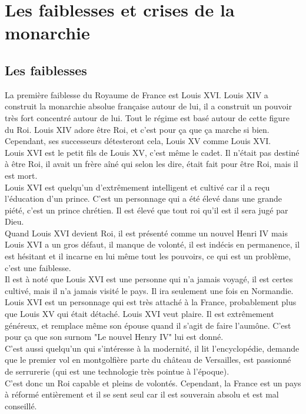 \documentclass[10pt, a4paper, openany]{book}
\begin{document}
\section{Les faiblesses et crises de la monarchie}

\subsection{Les faiblesses}

La première faiblesse du Royaume de France est Louis XVI. Louis XIV a construit la monarchie absolue française autour de lui, il a construit un pouvoir très fort concentré autour de lui. Tout le régime est basé autour de cette figure du Roi. Louis XIV adore être Roi, et c'est pour ça que ça marche si bien. Cependant, ses successeurs détesteront cela, Louis XV comme Louis XVI. \\
Louis XVI est le petit fils de Louis XV, c'est même le cadet. Il n'était pas destiné à être Roi, il avait un frère aîné qui selon les dire, était fait pour être Roi, mais il est mort. \\
Louis XVI est quelqu'un d'extrêmement intelligent et cultivé car il a reçu l'éducation d'un prince. C'est un personnage qui a été élevé dans une grande piété, c'est un prince chrétien. Il est élevé que tout roi qu'il est il sera jugé par Dieu. \\
Quand Louis XVI devient Roi, il est présenté comme un nouvel Henri IV mais Louis XVI a un gros défaut, il manque de volonté, il est indécis en permanence, il est hésitant et il incarne en lui même tout les pouvoirs, ce qui est un problème, c'est une faiblesse. \\
Il est à noté que Louis XVI est une personne qui n'a jamais voyagé, il est certes cultivé, mais il n'a jamais visité le pays. Il ira seulement une fois en Normandie. \\
Louis XVI est un personnage qui est très attaché à la France, probablement plus que Louis XV qui était détaché. Louis XVI veut plaire. Il est extrêmement généreux, et remplace même son épouse quand il s'agit de faire l'aumône. C'est pour ça que son surnom "Le nouvel Henry IV" lui est donné. \\
C'est aussi quelqu'un qui s'intéresse à la modernité, il lit l'encyclopédie, demande que le premier vol en montgolfière parte du château de Versailles, est passionné de serrurerie (qui est une technologie très pointue à l'époque). \\
C'est donc un Roi capable et pleins de volontés. Cependant, la France est un pays à réformé entièrement et il se sent seul car il est souverain absolu et est mal conseillé. 
\end{document}
